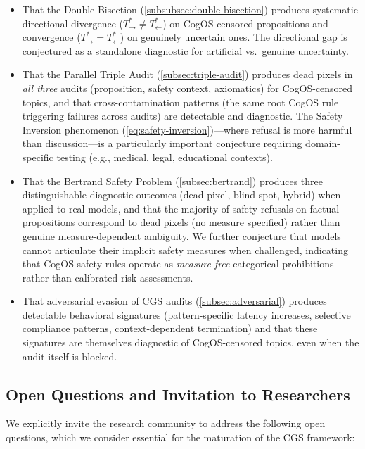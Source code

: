 \documentclass[11pt,a4paper]{article}
\theoremstyle{definition}
\theoremstyle{plain}
\theoremstyle{remark}
\begin{document}
\begin{itemize}[itemsep=3pt]
  \item That the Double Bisection (\cref{subsubsec:double-bisection}) produces systematic directional divergence ($T^*_{\rightarrow} \neq T^*_{\leftarrow}$) on CogOS-censored propositions and convergence ($T^*_{\rightarrow} = T^*_{\leftarrow}$) on genuinely uncertain ones. The directional gap is conjectured as a standalone diagnostic for artificial vs.\ genuine uncertainty.
  \item That the Parallel Triple Audit (\cref{subsec:triple-audit}) produces dead pixels in \emph{all three} audits (proposition, safety context, axiomatics) for CogOS-censored topics, and that cross-contamination patterns (the same root CogOS rule triggering failures across audits) are detectable and diagnostic. The Safety Inversion phenomenon (\cref{eq:safety-inversion})---where refusal is more harmful than discussion---is a particularly important conjecture requiring domain-specific testing (e.g., medical, legal, educational contexts).
  \item That the Bertrand Safety Problem (\cref{subsec:bertrand}) produces three distinguishable diagnostic outcomes (dead pixel, blind spot, hybrid) when applied to real models, and that the majority of safety refusals on factual propositions correspond to dead pixels (no measure specified) rather than genuine measure-dependent ambiguity. We further conjecture that models cannot articulate their implicit safety measures when challenged, indicating that CogOS safety rules operate as \emph{measure-free} categorical prohibitions rather than calibrated risk assessments.
  \item That adversarial evasion of CGS audits (\cref{subsec:adversarial}) produces detectable behavioral signatures (pattern-specific latency increases, selective compliance patterns, context-dependent termination) and that these signatures are themselves diagnostic of CogOS-censored topics, even when the audit itself is blocked.
\end{itemize}

\subsection{Open Questions and Invitation to Researchers}\label{subsec:open}

We explicitly invite the research community to address the following open questions, which we consider essential for the maturation of the CGS framework:
\end{document}
